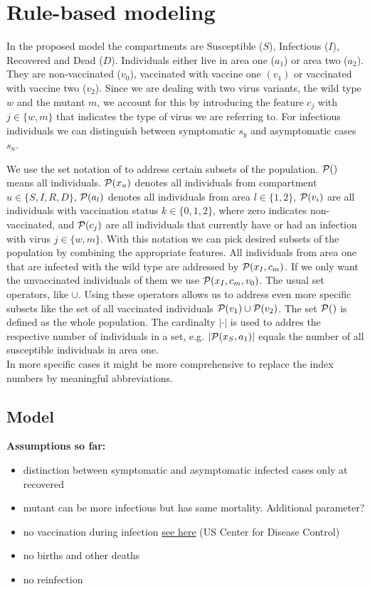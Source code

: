\section{Rule-based modeling}

In the proposed model the compartments are Susceptible ($S$), Infectious ($I$), Recovered and Dead ($D$). Individuals either live in area one ($a_1$) or area two ($a_2$). They are non-vaccinated ($v_0$), vaccinated with vaccine one $(v_1)$ or vaccinated with vaccine two ($v_2$). Since we are dealing with two virus variants, the wild type $w$ and the mutant $m$, we account for this by introducing the feature $c_j$ with $j \in \{w,m\}$ that indicates the type of virus we are referring to. For infectious individuals we can distinguish between symptomatic $s_y$ and asymptomatic cases $s_n$.
 
We use the set notation of \cite{Waites.2021} to address certain subsets of the population. $\mathcal{P}()$ means all individuals. $\mathcal{P}(x_u)$ denotes all individuals from compartment $u \in \{S, I, R, D \}$, $\mathcal{P}(a_l)$ denotes all individuals from area $l \in \{1,2\}$, $\mathcal{P}(v_i)$ are all individuals with vaccination status $k \in \{0,1,2\}$, where zero indicates non-vaccinated, and $\mathcal{P}(c_j)$ are all individuals that currently have or had an infection with virus $j \in \{w,m\}$. With this notation we can pick desired subsets of the population by combining the appropriate features. All individuals from area one that are infected with the wild type are addressed by $\mathcal{P}(x_I, c_m)$. If we only want the unvaccinated individuals of them we use $\mathcal{P}(x_I, c_m, v_0)$. The usual set operators, like $\cup$. Using these operators allows us to address even more specific subsets like the set of all vaccinated individuals $\mathcal{P}(v_1) \cup \mathcal{P}(v_2)$. The set $\mathcal{P}()$ is defined as the whole population. The cardinalty $|\cdot|$ is used to addres the respective number of individuals in a set, e.g. $|\mathcal{P}(x_S, a_1)|$ equals the number of all susceptible individuals in area one.\\

In more specific cases it might be more comprehensive to replace the index numbers by meaningful abbreviations.

\subsection{Model}

\textbf{Assumptions so far:} 
\begin{itemize}
    \item distinction between symptomatic and asymptomatic infected cases only at recovered
    \item mutant can be more infectious but has same mortality. Additional parameter?
    \item no vaccination during infection \href{https://www.cdc.gov/vaccines/covid-19/info-by-product/clinical-considerations.html}{see here} (US Center for Disease Control)
    \item no births and other deaths
    \item no reinfection
\end{itemize}
\vspace{0.5cm}

